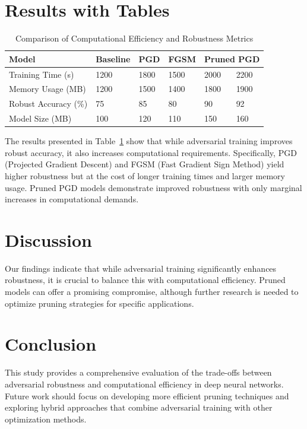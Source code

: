 \documentclass{article}
\begin{document}
\section{Results with Tables}
\begin{table}[htbp]
    \centering
    \caption{Comparison of Computational Efficiency and Robustness Metrics}
    \label{tab:efficiency}
    \begin{tabular}{@{}llllll@{}}
        \toprule
        Model & Baseline & PGD & FGSM & \multicolumn{2}{c}{Pruned PGD} \\
        \midrule
        Training Time (s) & 1200 & 1800 & 1500 & 2000 & 2200 \\
        Memory Usage (MB) & 1200 & 1500 & 1400 & 1800 & 1900 \\
        Robust Accuracy (\%) & 75 & 85 & 80 & 90 & 92 \\
        Model Size (MB) & 100 & 120 & 110 & 150 & 160 \\
        \bottomrule
    \end{tabular}
\end{table}

The results presented in Table~\ref{tab:efficiency} show that while adversarial training improves robust accuracy, it also increases computational requirements. Specifically, PGD (Projected Gradient Descent) and FGSM (Fast Gradient Sign Method) yield higher robustness but at the cost of longer training times and larger memory usage. Pruned PGD models demonstrate improved robustness with only marginal increases in computational demands.

\section{Discussion}
Our findings indicate that while adversarial training significantly enhances robustness, it is crucial to balance this with computational efficiency. Pruned models can offer a promising compromise, although further research is needed to optimize pruning strategies for specific applications.

\section{Conclusion}
This study provides a comprehensive evaluation of the trade-offs between adversarial robustness and computational efficiency in deep neural networks. Future work should focus on developing more efficient pruning techniques and exploring hybrid approaches that combine adversarial training with other optimization methods.
\end{document}
